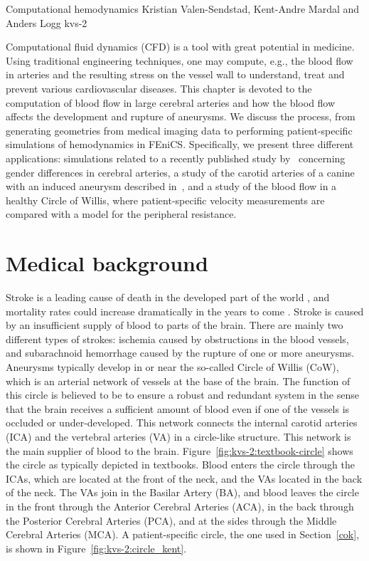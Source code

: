               {Computational hemodynamics}
              {Kristian Valen-Sendstad, Kent-Andre Mardal and Anders Logg}
              {kvs-2}

Computational fluid dynamics (CFD) is a tool with great potential in
medicine. Using traditional engineering techniques, one may compute,
e.g., the blood flow in arteries and the resulting stress on the
vessel wall to understand, treat and prevent various cardiovascular
diseases. This chapter is devoted to the computation of blood flow in
large cerebral arteries and how the blood flow affects the development
and rupture of aneurysms. We discuss the process, from generating
geometries from medical imaging data to performing patient-specific
simulations of hemodynamics in FEniCS. Specifically, we present three
different applications: simulations related to a recently published
study by~\citet{LindekleivValen-SendstadMorganEtAl2010} concerning
gender differences in cerebral arteries, a study of the carotid
arteries of a canine with an induced aneurysm described
in~\citet{JiangJohnsonValen-SendstadEtAl2010}, and a study of the
blood flow in a healthy Circle of Willis, where patient-specific
velocity measurements are compared with a model for the peripheral
resistance.

\section{Medical background} \label{Medical_Background}

Stroke is a leading cause of death in the developed part of the
world \citep{Feigin2005}, and mortality rates could increase
dramatically in the years to come \citep{MurrayLopez1997}. Stroke is
caused by an insufficient supply of blood to parts of the brain. There
are mainly two different types of strokes: ischemia caused by
obstructions in the blood vessels, and subarachnoid hemorrhage caused
by the rupture of one or more aneurysms. Aneurysms typically develop
in or near the so-called Circle of Willis (CoW), which is an arterial
network of vessels at the base of the brain. The function of this
circle is believed to be to ensure a robust and redundant system in
the sense that the brain receives a sufficient amount of blood even if
one of the vessels is occluded or under-developed. This network
connects the internal carotid arteries (ICA) and the vertebral
arteries (VA) in a circle-like structure. This network is the main
supplier of blood to the brain. Figure~\ref{fig:kvs-2:textbook-circle}
shows the circle as typically depicted in textbooks. Blood enters the
circle through the ICAs, which are located at the front of the neck,
and the VAs located in the back of the neck.  The VAs join in the
Basilar Artery (BA), and blood leaves the circle in the front through
the Anterior Cerebral Arteries (ACA), in the back through the
Posterior Cerebral Arteries (PCA), and at the sides through the Middle
Cerebral Arteries (MCA). A patient-specific circle, the one used in
Section~\ref{cok}, is shown in Figure~\ref{fig:kvs-2:circle_kent}.

